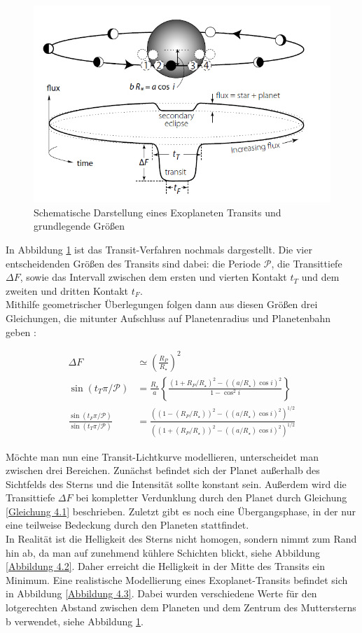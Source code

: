 \documentclass[ngerman,ruledheaders=section,class=report,thesis={type=Protokoll},accentcolor=1b,marginpar=false,parskip=half-,fontsize=11pt,]{tudapub}
\begin{document}
	\begin{figure}[h!]
		\centering
		\includegraphics[width=0.6\linewidth]{TransitDarstellung.jpg}
		\caption{Schematische Darstellung eines Exoplaneten Transits und grundlegende Größen \cite{ExoHand}}
		\label{Abbildung 4.1}
	\end{figure}
	
	In Abbildung \ref{Abbildung 4.1} ist das Transit-Verfahren nochmals dargestellt. Die vier entscheidenden Größen des Transits sind dabei: die Periode $\mathcal{P}$, die Transittiefe $\Delta F$, sowie das Intervall zwischen dem ersten und vierten Kontakt $t_T$ und dem zweiten und dritten Kontakt $t_F$.  \\
	Mithilfe geometrischer Überlegungen folgen dann aus diesen Größen drei Gleichungen, die mitunter Aufschluss auf Planetenradius und Planetenbahn geben \cite{ExoHand}: 
	
	\begin{align} \label{Gleichung 4.1}
		\Delta F &\simeq \left( \frac{R_P}{R_\star} \right)^2 \\
		\sin\left( t_T \pi / \mathcal{P} \right) &= \frac{R_\star}{a} 
		\left\{ \frac{\left(1 + R_P / R_\star\right)^2 - \left( \left( a / R_\star \right) \cos i\right)^2}
		{1- \cos^2i} \right\} \\
		\frac{\sin (t_F \pi / \mathcal{P})}{\sin(t_T \pi / \mathcal{P})} & =
		\frac{\left( \left( 1- (R_P / R_\star)\right)^2 - \left( (a/ R_\star)\cos i\right)^2  
			\right)^{1/2} }
		{\left( \left(1 + (R_P / R_\star) \right)^2 - \left( (a/ R_\star) \cos i \right)^2
			\right)^{1/2}}
	\end{align}
	
	Möchte man nun eine Transit-Lichtkurve modellieren, unterscheidet man zwischen drei Bereichen. Zunächst befindet sich der Planet außerhalb des Sichtfelds des Sterns und die Intensität sollte konstant sein. Außerdem wird die Transittiefe $\Delta F$ bei kompletter Verdunklung durch den Planet durch Gleichung \ref{Gleichung 4.1} beschrieben. Zuletzt gibt es noch eine Übergangsphase, in der nur eine teilweise Bedeckung durch den Planeten stattfindet. \\
	In Realität ist die Helligkeit des Sterns nicht homogen, sondern nimmt zum Rand hin ab, da man auf zunehmend kühlere Schichten blickt, siehe Abbildung \ref{Abbildung 4.2}. Daher erreicht die Helligkeit in der Mitte des Transits ein Minimum. Eine realistische Modellierung eines Exoplanet-Transits befindet sich in Abbildung \ref{Abbildung 4.3}. Dabei wurden verschiedene Werte für den lotgerechten Abstand zwischen dem Planeten und dem Zentrum des Muttersterns b verwendet, siehe Abbildung \ref{Abbildung 4.1}.
	
\end{document}
